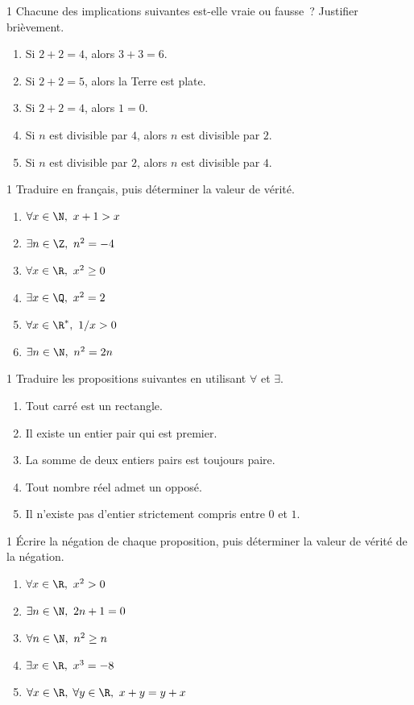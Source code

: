 \begin{exo}{1}
Chacune des implications suivantes est-elle vraie ou fausse~?
Justifier bri\`evement.
\begin{enumerate}
  \item Si $2 + 2 = 4$, alors $3 + 3 = 6$.
  \item Si $2 + 2 = 5$, alors la Terre est plate.
  \item Si $2 + 2 = 4$, alors $1 = 0$.
  \item Si $n$ est divisible par $4$, alors $n$ est divisible par $2$.
  \item Si $n$ est divisible par $2$, alors $n$ est divisible par $4$.
\end{enumerate}
\end{exo}

\begin{exo}{1}
Traduire en fran\c cais, puis d\'eterminer la valeur de v\'erit\'e.
\begin{enumerate}
  \item $\forall x \in \N,\ x+1 > x$
  \item $\exists n \in \Z,\ n^2 = -4$
  \item $\forall x \in \R,\ x^2 \geq 0$
  \item $\exists x \in \Q,\ x^2 = 2$
  \item $\forall x \in \R^*,\ 1/x > 0$
  \item $\exists n \in \N,\ n^2 = 2n$
\end{enumerate}
\end{exo}

\begin{exo}{1}
Traduire les propositions suivantes en utilisant $\forall$ et $\exists$.
\begin{enumerate}
  \item Tout carr\'e est un rectangle.
  \item Il existe un entier pair qui est premier.
  \item La somme de deux entiers pairs est toujours paire.
  \item Tout nombre r\'eel admet un oppos\'e.
  \item Il n'existe pas d'entier strictement compris entre $0$ et $1$.
\end{enumerate}
\end{exo}

\begin{exo}{1}
\'Ecrire la n\'egation de chaque proposition, puis d\'eterminer la valeur
de v\'erit\'e de la n\'egation.
\begin{enumerate}
  \item $\forall x \in \R,\ x^2 > 0$
  \item $\exists n \in \N,\ 2n+1 = 0$
  \item $\forall n \in \N,\ n^2 \geq n$
  \item $\exists x \in \R,\ x^3 = -8$
  \item $\forall x \in \R,\; \forall y \in \R,\ x + y = y + x$
\end{enumerate}
\end{exo}

